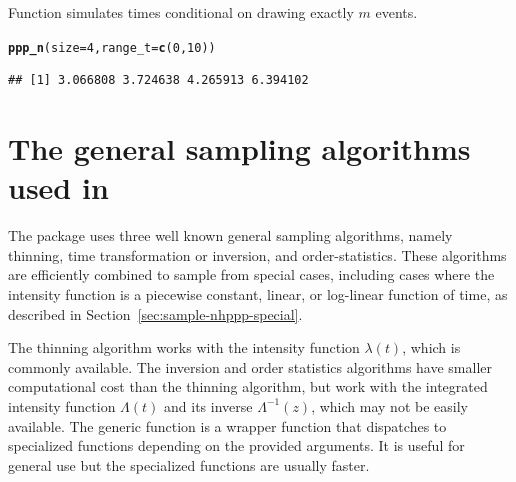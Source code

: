 \documentclass[article,nojss]{jss}\usepackage[]{graphicx}\usepackage[]{xcolor}
\makeatletter
\newcommand{\hlnum}[1]{\textcolor[rgb]{0.686,0.059,0.569}{#1}}%
\newcommand{\hlstd}[1]{\textcolor[rgb]{0.345,0.345,0.345}{#1}}%
\newcommand{\hlkwc}[1]{\textcolor[rgb]{0.333,0.667,0.333}{#1}}%
\newcommand{\hlkwd}[1]{\textcolor[rgb]{0.737,0.353,0.396}{\textbf{#1}}}%
\newenvironment{kframe}{%
 \def\at@end@of@kframe{}%
 \ifinner\ifhmode%
  \def\at@end@of@kframe{\end{minipage}}%
  \begin{minipage}{\columnwidth}%
 \fi\fi%
 \def\FrameCommand##1{\hskip\@totalleftmargin \hskip-\fboxsep
 \colorbox{shadecolor}{##1}\hskip-\fboxsep
     \hskip-\linewidth \hskip-\@totalleftmargin \hskip\columnwidth}%
 \MakeFramed {\advance\hsize-\width
   \@totalleftmargin\z@ \linewidth\hsize
   \@setminipage}}%
 {\par\unskip\endMakeFramed%
 \at@end@of@kframe}
\newenvironment{knitrout}{}{} %
\newcommand{\fct}[1]{\code{#1()}}
\makeatother
\begin{document}
Function \fct{ppp\_n} simulates times conditional on drawing exactly $m$ events.
\begin{knitrout}
\color{fgcolor}\begin{kframe}
\begin{alltt}
\hlkwd{ppp_n}\hlstd{(}\hlkwc{size} \hlstd{=} \hlnum{4}\hlstd{,} \hlkwc{range_t} \hlstd{=} \hlkwd{c}\hlstd{(}\hlnum{0}\hlstd{,} \hlnum{10}\hlstd{))}
\end{alltt}
\begin{verbatim}
## [1] 3.066808 3.724638 4.265913 6.394102
\end{verbatim}
\end{kframe}
\end{knitrout}

\section[The general sampling algorithms used in nhppp]{The general sampling algorithms used in }\label{sec:general-sampling}

The  package uses three well known general sampling algorithms, namely thinning, time transformation or inversion, and order-statistics. These algorithms are efficiently combined to sample from special cases, including cases where the intensity function is a piecewise constant, linear, or log-linear function of time, as described in Section~\ref{sec:sample-nhppp-special}.

The thinning algorithm works with the intensity function $\lambda(t)$, which is commonly available. The inversion and order statistics algorithms have smaller computational cost than the thinning algorithm, but work with the integrated intensity function $\Lambda(t)$ and its inverse $\Lambda^{-1}(z)$, which may not be easily available. The generic function \fct{draw} is a wrapper function that dispatches to specialized functions depending on the provided arguments. It is useful for general use but the specialized functions are usually faster.
\end{document}
